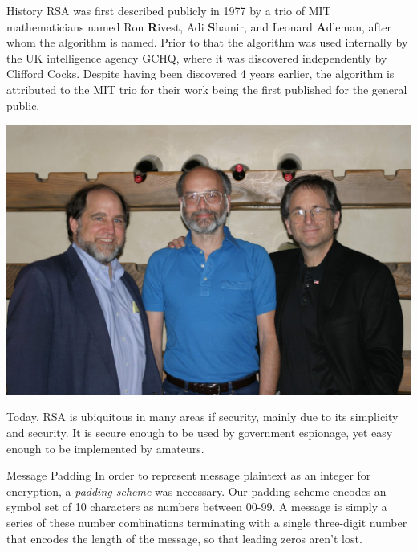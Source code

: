 \documentclass[landscape,a0paper,fontscale=.46]{baposter} %
\begin{document}
\begin{poster}

\begin{posterbox}[name=history, column=1, below=rsa,span=2]{History}
RSA was first described publicly in 1977 by a trio of MIT mathematicians named Ron \textbf{R}ivest, Adi \textbf{S}hamir, and Leonard \textbf{A}dleman, after whom the algorithm is named. Prior to that the algorithm was used internally by the UK intelligence agency GCHQ, where it was discovered independently by Clifford Cocks. Despite having been discovered 4 years earlier, the algorithm is attributed to the MIT trio for their work being the first published for the general public.

\begin{center}
\includegraphics[width=0.8\linewidth]{RSA-2003.jpg}
\end{center}


Today, RSA is ubiquitous in many areas if security, mainly due to its simplicity and security. It is secure enough to be used by government espionage, yet easy enough to be implemented by amateurs. 
\end{posterbox}


\begin{posterbox}[name=padding, column=4, below=code]{Message Padding}
In order to represent message plaintext as an integer for encryption, a \emph{padding scheme} was necessary. Our padding scheme encodes an symbol set of 10 characters as numbers between 00-99. A message is simply a series of these number combinations terminating with a single three-digit number that encodes the length of the message, so that leading zeros aren't lost.
\end{posterbox}


\end{poster}
\end{document}
